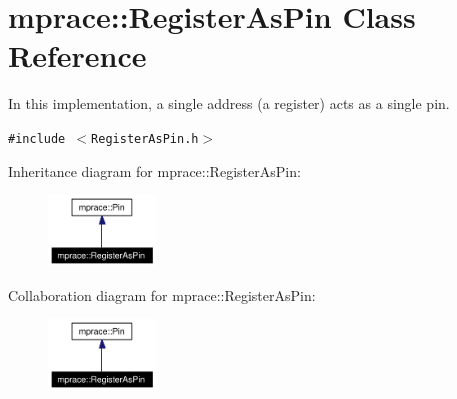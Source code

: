 \hypertarget{classmprace_1_1RegisterAsPin}{
\section{mprace::Register\-As\-Pin Class Reference}
\label{classmprace_1_1RegisterAsPin}
}
In this implementation, a single address (a register) acts as a single pin.  


{\tt \#include $<$Register\-As\-Pin.h$>$}

Inheritance diagram for mprace::Register\-As\-Pin:\begin{figure}[H]
\begin{center}
\leavevmode
\includegraphics[width=81pt]{classmprace_1_1RegisterAsPin__inherit__graph}
\end{center}
\end{figure}
Collaboration diagram for mprace::Register\-As\-Pin:\begin{figure}[H]
\begin{center}
\leavevmode
\includegraphics[width=81pt]{classmprace_1_1RegisterAsPin__coll__graph}
\end{center}
\end{figure}
